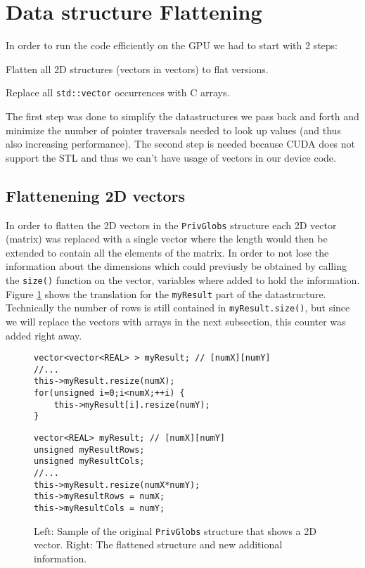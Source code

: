 \section{Data structure Flattening}

In order to run the code efficiently on the GPU we had to start with 2 steps:
\begin{enumerate*}
	\item Flatten all 2D structures (vectors in vectors) to flat versions.
    \item Replace all \texttt{std::vector} occurrences with C arrays.
\end{enumerate*}

The first step was done to simplify the datastructures we pass back and forth
and minimize the number of pointer traversals needed to look up values (and thus also increasing performance). The
second step is needed because CUDA does not support the STL and thus we can't
have usage of vectors in our device code.

\subsection{Flattenening 2D vectors}

In order to flatten the 2D vectors in the \texttt{PrivGlobs} structure each
2D vector (matrix) was replaced with a single vector where the length would then
be extended to contain all the elements of the matrix. In order to not lose
the information about the dimensions which could previusly be obtained by
calling the \texttt{size()} function on the vector, variables
where added to hold the information. Figure \ref{code:privglobsflatten} shows
the translation for the \texttt{myResult} part of the datastructure. Technically
the number of rows is still contained in \texttt{myResult.size()}, but since we
will replace the vectors with arrays in the next subsection, this counter was
added right away.

\begin{figure}[H]
\begin{minipage}{.45\textwidth}
\begin{lstlisting}
vector<vector<REAL> > myResult; // [numX][numY]
//...
this->myResult.resize(numX);
for(unsigned i=0;i<numX;++i) {
    this->myResult[i].resize(numY);
}
\end{lstlisting}
\end{minipage}\hfill
\begin{minipage}{.45\textwidth}
\begin{lstlisting}
vector<REAL> myResult; // [numX][numY]
unsigned myResultRows;
unsigned myResultCols;
//...
this->myResult.resize(numX*numY);
this->myResultRows = numX;
this->myResultCols = numY;
\end{lstlisting}
\end{minipage}
\caption{Left: Sample of the original \texttt{PrivGlobs} structure that shows a
2D vector. Right: The flattened structure and new additional information.}
\label{code:privglobsflatten}
\end{figure}

